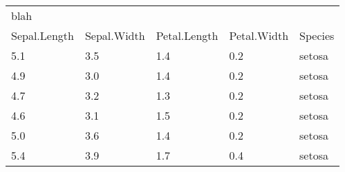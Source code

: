 \begin{tabular}{lllll}
blah &  &  &  &  \\
Sepal.Length & Sepal.Width & Petal.Length & Petal.Width & Species \\
5.1 & 3.5 & 1.4 & 0.2 & setosa \\
4.9 & 3.0 & 1.4 & 0.2 & setosa \\
4.7 & 3.2 & 1.3 & 0.2 & setosa \\
4.6 & 3.1 & 1.5 & 0.2 & setosa \\
5.0 & 3.6 & 1.4 & 0.2 & setosa \\
5.4 & 3.9 & 1.7 & 0.4 & setosa \\
\end{tabular} 
